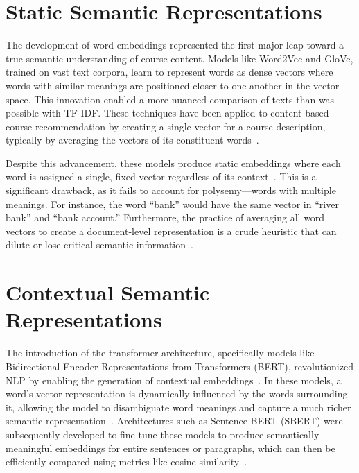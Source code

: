 \section{Static Semantic Representations}\label{ch:2.2}
The development of word embeddings represented the first major leap toward a true semantic understanding of course content. Models like Word2Vec and GloVe, trained on vast text corpora, learn to represent words as dense vectors where words with similar meanings are positioned closer to one another in the vector space. This innovation enabled a more nuanced comparison of texts than was possible with TF-IDF. These techniques have been applied to content-based course recommendation by creating a single vector for a course description, typically by averaging the vectors of its constituent words~\cite{pardos10.1145/3330430.3333622}.

Despite this advancement, these models produce static embeddings where each word is assigned a single, fixed vector regardless of its context~\cite{devlin2019bertpretrainingdeepbidirectional}. This is a significant drawback, as it fails to account for polysemy---words with multiple meanings. For instance, the word ``bank'' would have the same vector in ``river bank'' and ``bank account.'' Furthermore, the practice of averaging all word vectors to create a document-level representation is a crude heuristic that can dilute or lose critical semantic information~\cite{reimers-2019-sentence-bert}.

\section{Contextual Semantic Representations}\label{ch:2.3}
The introduction of the transformer architecture, specifically models like Bidirectional Encoder Representations from Transformers (BERT), revolutionized NLP by enabling the generation of contextual embeddings~\cite{devlin2019bertpretrainingdeepbidirectional}. In these models, a word's vector representation is dynamically influenced by the words surrounding it, allowing the model to disambiguate word meanings and capture a much richer semantic representation~\cite{devlin2019bertpretrainingdeepbidirectional}. Architectures such as Sentence-BERT (SBERT) were subsequently developed to fine-tune these models to produce semantically meaningful embeddings for entire sentences or paragraphs, which can then be efficiently compared using metrics like cosine similarity~\cite{reimers-2019-sentence-bert}.

